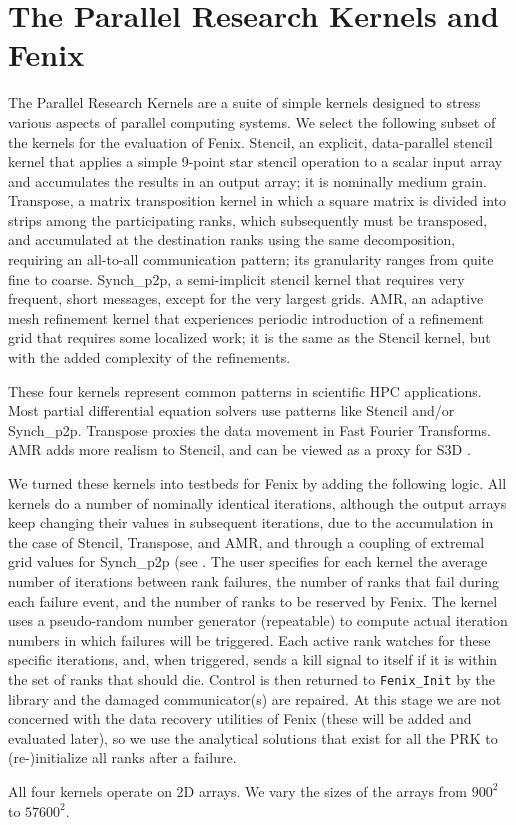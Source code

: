 \section{The Parallel Research Kernels and Fenix}\label{sec:PRK}
The Parallel Research Kernels \cite{van2016comparing,PRKrepo}
are a suite of simple kernels designed to stress various aspects of parallel computing systems.
We select the following subset of the kernels for the evaluation of Fenix.
Stencil, an explicit, data-parallel stencil kernel that applies a simple 9-point star stencil
operation to a scalar input array and accumulates the results in an output array; it is nominally medium grain.
Transpose, a matrix transposition kernel in which a square matrix is divided into strips among the
participating ranks, which subsequently must be transposed, and accumulated at the destination ranks using
the same decomposition, requiring an all-to-all communication pattern;
its granularity ranges from quite fine to coarse.
Synch\_p2p, a semi-implicit stencil kernel that requires very frequent, short messages, except for
the very largest grids.
AMR, an adaptive mesh refinement kernel \cite{AMRPRK} that experiences periodic introduction of
a refinement grid that requires some localized work; it is the same as the Stencil kernel,
but with the added complexity of the refinements.

These four kernels represent common patterns in scientific HPC applications. Most partial differential
equation solvers use patterns like Stencil and/or Synch\_p2p. Transpose proxies the data movement
in Fast Fourier Transforms. AMR adds more realism to Stencil, and can be viewed as a proxy for S3D
\cite{Gamell:2014}.

We turned these kernels into testbeds for Fenix by adding the following logic.
All kernels do a number of nominally identical iterations, although the output arrays keep
changing their values in subsequent iterations, due to the accumulation in the case of Stencil,
Transpose, and AMR, and through a coupling of extremal grid values for Synch\_p2p
(see \cite{van2016comparing}.
The user specifies for each kernel the average number of iterations between rank failures,
the number of ranks that fail during each failure event, and the number of ranks to be
reserved by Fenix.
The kernel uses a pseudo-random number generator (repeatable) to compute actual iteration
numbers in which failures will be triggered.
Each active rank watches for these specific iterations, and, when triggered, sends a
kill signal to itself if it is within the set of ranks that should die.
Control is then returned to \texttt{Fenix\_Init} by the library and the damaged communicator(s)
are repaired.
At this stage we are not concerned with the data recovery utilities of Fenix (these will be
added and evaluated later), so we use the analytical solutions that exist for all the PRK to (re-)initialize
all ranks after a failure.

All four kernels operate on 2D arrays.
We vary the sizes of the arrays from $900^2$ to $57600^2$.


